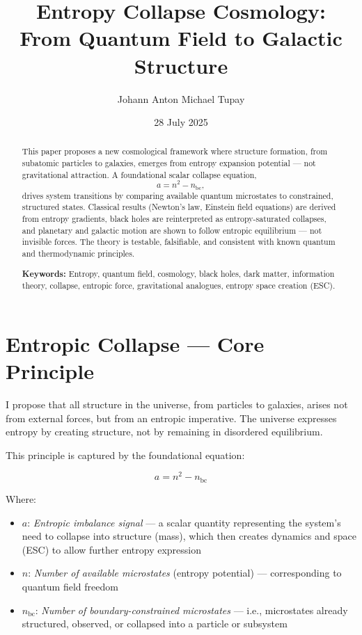 \documentclass[12pt]{article}
\title{\textbf{Entropy Collapse Cosmology: \\ From Quantum Field to Galactic Structure}}
\author{Johann Anton Michael Tupay}
\affil{London, United Kingdom\\
\texttt{jamtupay@icloud.com}}
\date{28 July 2025}
\begin{document}
\maketitle

\vspace{-1.5em}
\begin{abstract}
\noindent
This paper proposes a new cosmological framework where structure formation, 
from subatomic particles to galaxies, emerges from entropy expansion potential 
— not gravitational attraction. A foundational scalar collapse equation,
\[
a = n^2 - n_{\text{bc}},
\]
drives system transitions by comparing available quantum
microstates to constrained, structured states. Classical results (Newton's law, 
Einstein field equations) are derived from entropy gradients, black holes are 
reinterpreted as entropy-saturated collapses, and planetary and galactic motion 
are shown to follow entropic equilibrium — not invisible forces. The theory is 
testable, falsifiable, and consistent with known quantum and thermodynamic principles.

\vspace{0.5em}
\noindent\textbf{Keywords:} Entropy, quantum field, cosmology, black holes, dark matter, information theory, collapse, entropic force, gravitational analogues, entropy space creation (ESC).
\end{abstract}

\newpage

\section{Entropic Collapse — Core Principle}

I propose that all structure in the universe, from particles to galaxies, arises not from external forces, but from an entropic imperative. The universe expresses entropy by creating structure, not by remaining in disordered equilibrium.

This principle is captured by the foundational equation:

\[
a = n^2 - n_{\text{bc}}
\]

\noindent
Where:

\begin{itemize}
    \item $a$: \textit{Entropic imbalance signal} — a scalar quantity representing the system’s need to collapse into structure (mass), which then creates dynamics and space (ESC) to allow further entropy expression
    \item $n$: \textit{Number of available microstates} (entropy potential) — corresponding to quantum field freedom
    \item $n_{\text{bc}}$: \textit{Number of boundary-constrained microstates} — i.e., microstates already structured, observed, or collapsed into a particle or subsystem
\end{itemize}
\end{document}
